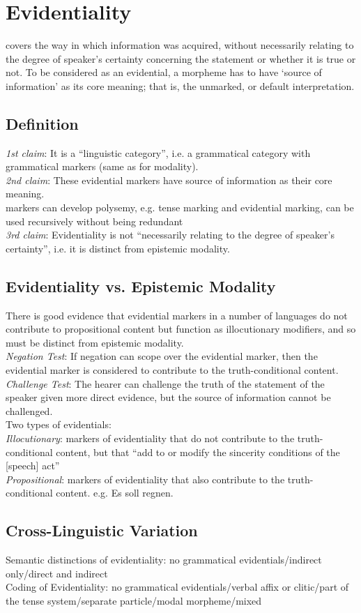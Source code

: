 \section{Evidentiality}
covers the way in which information was acquired, without necessarily relating to the degree of speaker’s certainty concerning the statement or whether it is true or not. To be considered as an evidential, a morpheme has to have ‘source of information’ as its core meaning; that is, the unmarked, or default
interpretation.
\subsection*{Definition}
\emph{1st claim}: It is a “linguistic category”, i.e. a grammatical category with grammatical markers (same as for modality).\\
\emph{2nd claim}: These evidential markers have source of information as their core meaning.\\
markers can develop polysemy, e.g. tense marking and evidential marking, can be used recursively without being redundant\\
\emph{3rd claim}: Evidentiality is not “necessarily relating to the degree of speaker’s certainty”, i.e. it is distinct from epistemic modality.
\subsection*{Evidentiality vs. Epistemic Modality}
There is good evidence that evidential markers in a number of languages do not contribute to propositional content but function as illocutionary modifiers, and so must be distinct from epistemic modality.\\
\emph{Negation Test}: If negation can scope over the evidential marker, then the evidential marker is considered to contribute to the truth-conditional content.\\
\emph{Challenge Test}: The hearer can challenge the truth of the statement of the
speaker given more direct evidence, but the source of information cannot be challenged.\\
Two types of evidentials:\\
\emph{Illocutionary}: markers of evidentiality that do not contribute to the truth-conditional content, but that “add to or modify the sincerity conditions of the [speech] act”\\
\emph{Propositional}: markers of evidentiality that also contribute to the truth-conditional content. e.g. Es soll regnen.
\subsection{Cross-Linguistic Variation}
Semantic distinctions of evidentiality: no grammatical evidentials/indirect only/direct and indirect\\
Coding of Evidentiality: no grammatical evidentials/verbal affix or clitic/part of the tense system/separate particle/modal morpheme/mixed